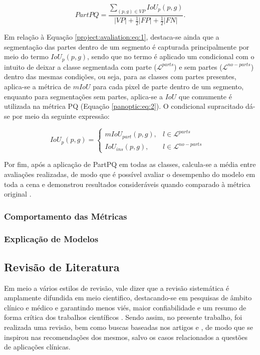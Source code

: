 \begin{equation}
\label{project:avaliation:eq:1}
    PartPQ = \frac{\sum _{(p,g) \in VP} IoU_p(p,g)}{|VP|+ \frac{1}{2}|FP| + \frac{1}{2}|FN|}.
\end{equation}

Em relação à Equação \ref{project:avaliation:eq:1}, destaca-se ainda que a segmentação das partes dentro de um segmento é capturada principalmente por meio do termo $IoU_p(p,g)$, sendo que no termo é aplicado um condicional com o intuito de deixar a classe segmentada com parte ($\mathcal{L}^{parts}$) e sem partes ($\mathcal{L}^{no-parts}$) dentro das mesmas condições, ou seja, para as classes com partes presentes, aplica-se a métrica de $mIoU$ para cada pixel de parte dentro de um segmento, enquanto para segmentações sem partes, aplica-se a $IoU$ que comumente é utilizada na métrica PQ (Equação \ref{panoptic:eq:2}). O condicional supracitado dá-se por meio da seguinte expressão:

\begin{equation}
\label{project:avaliation:eq:2}
    IoU_p(p,g)= \left\{\begin{matrix}
        mIoU_{part}(p,g), & l \in \mathcal{L}^{parts}    & \\ 
        IoU_{ins}(p,g),        & l \in \mathcal{L}^{no-parts} & 
    \end{matrix}\right.
\end{equation}

Por fim, após a aplicação de PartPQ em todas as classes, calcula-se a média entre avaliações realizadas, de modo que é possível avaliar o desempenho do modelo em toda a cena e demonstrou resultados consideráveis quando comparado à métrica original \cite{DeGeus2021}.

\subsubsection{Comportamento das Métricas}

\subsubsection{Explicação de Modelos}


\subsection{Revisão de Literatura}
\label{project:revision}
Em meio a vários estilos de revisão, vale dizer que a revisão sistemática é amplamente difundida em meio cientifico, destacando-se em pesquisas de âmbito clínico e médico e garantindo menos viés, maior confiabilidade e um resumo de forma crítica dos trabalhos científicos \cite{barbosa2019}. Sendo assim, no presente trabalho, foi realizada uma revisão, bem como buscas baseadas nos artigos \cite{barbosa2019} e \cite{liberati2009}, de modo que se inspirou nas recomendações dos mesmos, salvo os casos relacionados a questões de aplicações clínicas.

